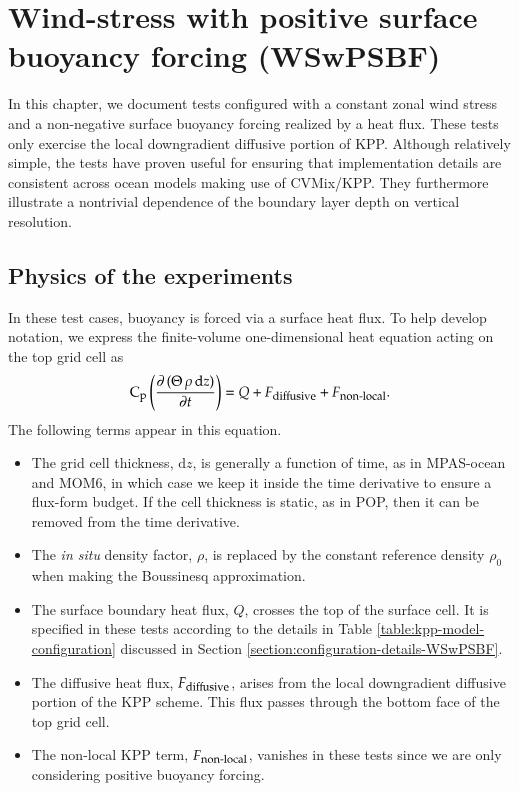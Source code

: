 \chapter{Wind-stress with positive surface buoyancy forcing
   (WSwPSBF)}
\label{chapter:WSwPSBF}

In this chapter, we document tests configured with a constant zonal
wind stress and a non-negative surface buoyancy forcing realized by a
heat flux.  These tests only exercise the local downgradient diffusive
portion of KPP.  Although relatively simple, the tests have proven
useful for ensuring that implementation details are consistent across
ocean models making use of CVMix/KPP.  They furthermore illustrate a
nontrivial dependence of the boundary layer depth on vertical
resolution.

\minitoc

\section{Physics of the experiments}

In these test cases, buoyancy is forced via a surface heat flux.  To
help develop notation, we express the finite-volume one-dimensional
heat equation acting on the top grid cell as
\begin{equation}
  \mbox{C}_{\mbox{\footnotesize p}} \left(   \frac{\partial  \, (\Theta \, \rho \, \mathrm{d}z )}{\partial t}  \right) =  
  Q + F_{\mbox{\footnotesize diffusive}} + F_{\mbox{\footnotesize non-local}}.
\label{eq:surface-heat-equation}
\end{equation}
The following terms appear in this equation.
\begin{itemize}
\item The grid cell thickness, $\mathrm{d}z$, is generally a function
  of time, as in MPAS-ocean and MOM6, in which case we keep it inside
  the time derivative to ensure a flux-form budget.  If the cell
  thickness is static, as in POP, then it can be removed from the time
  derivative.

\item The {\it in situ} density factor, $\rho$, is replaced by the
  constant reference density $\rho_{0}$ when making the Boussinesq
  approximation.

\item The surface boundary heat flux, $Q$, crosses the top of the
  surface cell.  It is specified in these tests according to the
  details in Table \ref{table:kpp-model-configuration} discussed in
  Section \ref{section:configuration-details-WSwPSBF}.

\item The diffusive heat flux, $F_{\mbox{\footnotesize diffusive}}$,
  arises from the local downgradient diffusive portion of the KPP
  scheme.  This flux passes through the bottom face of the top grid
  cell.

\item The non-local KPP term, $F_{\mbox{\footnotesize non-local}}$,
  vanishes in these tests since we are only considering positive
  buoyancy forcing.

\end{itemize}


